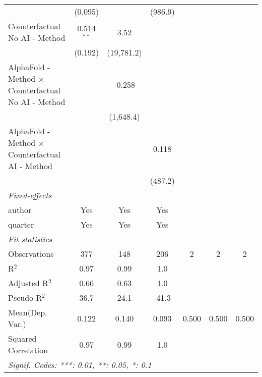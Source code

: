 \begin{tabular}{lcccccc}
                                                              & (0.095)      &              & (986.9)        &     &     &   \\   
   Counterfactual No AI - Method                              & 0.514$^{**}$ & 3.52         &                &     &     &   \\   
                                                              & (0.192)      & (19,781.2)   &                &     &     &   \\   
   AlphaFold - Method $\times$ Counterfactual No AI - Method  &              & -0.258       &                &     &     &   \\   
                                                              &              & (1,648.4)    &                &     &     &   \\   
   AlphaFold - Method $\times$ Counterfactual AI - Method     &              &              & 0.118          &     &     &   \\   
                                                              &              &              & (487.2)        &     &     &   \\   
   \midrule
   \emph{Fixed-effects}\\
   author                                                     & Yes          & Yes          & Yes            &     &     & \\  
   quarter                                                    & Yes          & Yes          & Yes            &     &     & \\  
   \midrule
   \emph{Fit statistics}\\
   Observations                                               & 377          & 148          & 206            & 2   & 2   & 2\\  
   R$^2$                                                      & 0.97         & 0.99         & 1.0            &     &     & \\  
   Adjusted R$^2$                                             & 0.66         & 0.63         & 1.0            &     &     & \\  
   Pseudo R$^2$                                               & 36.7         & 24.1         & -41.3          &     &     & \\  
Mean(Dep. Var.) & 0.122 & 0.140 & 0.093 & 0.500 & 0.500 & 0.500 \\
   Squared Correlation                                        & 0.97         & 0.99         & 1.0            &     &     & \\  
   \midrule \midrule
   \multicolumn{7}{l}{\emph{Signif. Codes: ***: 0.01, **: 0.05, *: 0.1}}\\
\end{tabular}
\par\endgroup
